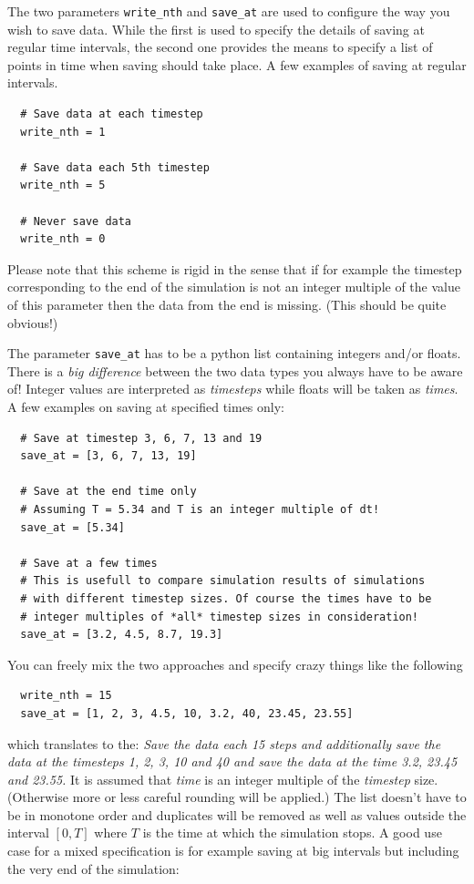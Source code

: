 \documentclass[a4paper,10pt]{report}
\begin{document}
The two parameters \verb|write_nth| and \verb|save_at| are used to configure the
way you wish to save data. While the first is used to specify the details of saving
at regular time intervals, the second one provides the means to specify a list
of points in time when saving should take place. A few examples of saving at regular
intervals.

\begin{verbatim}
  # Save data at each timestep
  write_nth = 1

  # Save data each 5th timestep
  write_nth = 5

  # Never save data
  write_nth = 0
\end{verbatim}

Please note that this scheme is rigid in the sense that if for example the timestep
corresponding to the end of the simulation is not an integer multiple of the value
of this parameter then the data from the end is missing. (This should be quite obvious!)

The parameter \verb|save_at| has to be a python list containing integers
and/or floats. There is a \emph{big difference} between the two data types
you always have to be aware of! Integer values are interpreted as \emph{timesteps}
while floats will be taken as \emph{times}. A few examples on saving at specified
times only:

\begin{verbatim}
  # Save at timestep 3, 6, 7, 13 and 19
  save_at = [3, 6, 7, 13, 19]

  # Save at the end time only
  # Assuming T = 5.34 and T is an integer multiple of dt!
  save_at = [5.34]

  # Save at a few times
  # This is usefull to compare simulation results of simulations
  # with different timestep sizes. Of course the times have to be
  # integer multiples of *all* timestep sizes in consideration!
  save_at = [3.2, 4.5, 8.7, 19.3]
\end{verbatim}

You can freely mix the two approaches and specify crazy things like
the following

\begin{verbatim}
  write_nth = 15
  save_at = [1, 2, 3, 4.5, 10, 3.2, 40, 23.45, 23.55]
\end{verbatim}

which translates to the: \emph{Save the data each 15 steps and additionally
save the data at the timesteps 1, 2, 3, 10 and 40 and save the data at the time 3.2,
23.45 and 23.55.} It is assumed that \emph{time} is an integer multiple of the
\emph{timestep} size. (Otherwise more or less careful rounding will be applied.)
The list doesn't have to be in monotone order and duplicates will be removed as well
as values outside the interval $[0, T]$ where $T$ is the time at which the simulation
stops. A good use case for a mixed specification is for example saving at big
intervals but including the very end of the simulation:
\end{document}
